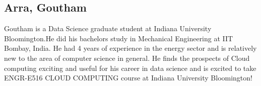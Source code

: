 \subsection{Arra, Goutham}

Goutham is a Data Science graduate student at Indiana University Bloomington.He
did his bachelors study in Mechanical Engineering at IIT Bombay, India. He had 4
years of experience in the energy sector and is relatively new to the area of
computer science in general. He finds the prospects of Cloud computing exciting
and useful for his career in data science and is excited to take ENGR-E516 CLOUD
COMPUTING course at Indiana University Bloomington!
